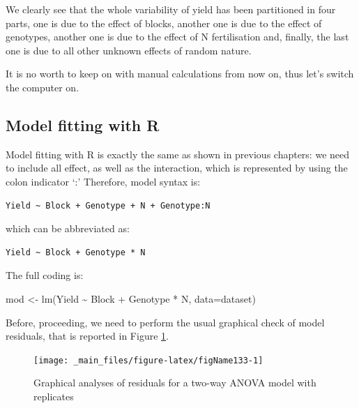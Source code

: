 \documentclass[a4paper,12pt,oneside]{book}
\newenvironment{Shaded}{\begin{snugshade}}{\end{snugshade}}
\newcommand{\SpecialCharTok}[1]{#1}
\newcommand{\OtherTok}[1]{#1}
\newcommand{\FunctionTok}[1]{#1}
\newcommand{\AttributeTok}[1]{#1}
\newcommand{\NormalTok}[1]{#1}
\begin{document}
We clearly see that the whole variability of yield has been partitioned in four parts, one is due to the effect of blocks, another one is due to the effect of genotypes, another one is due to the effect of N fertilisation and, finally, the last one is due to all other unknown effects of random nature.

It is no worth to keep on with manual calculations from now on, thus let's switch the computer on.

\hypertarget{model-fitting-with-r-1}{%
\subsection{Model fitting with R}\label{model-fitting-with-r-1}}

Model fitting with R is exactly the same as shown in previous chapters: we need to include all effect, as well as the interaction, which is represented by using the colon indicator `:' Therefore, model syntax is:

\vspace{12pt}

\begin{verbatim}
Yield ~ Block + Genotype + N + Genotype:N
\end{verbatim}

which can be abbreviated as:

\vspace{12pt}

\begin{verbatim}
Yield ~ Block + Genotype * N
\end{verbatim}

The full coding is:

\vspace{12pt}

\begin{Shaded}
\begin{Highlighting}[]
\NormalTok{mod }\OtherTok{\textless{}{-}} \FunctionTok{lm}\NormalTok{(Yield }\SpecialCharTok{\textasciitilde{}}\NormalTok{ Block }\SpecialCharTok{+}\NormalTok{ Genotype }\SpecialCharTok{*}\NormalTok{ N, }\AttributeTok{data=}\NormalTok{dataset)}
\end{Highlighting}
\end{Shaded}

Before, proceeding, we need to perform the usual graphical check of model residuals, that is reported in Figure \ref{fig:figName133}.

\vspace{12pt}
\begin{figure}

{\centering \texttt{[image: \_main\_files/figure-latex/figName133-1]} 

}

\caption{Graphical analyses of residuals for a two-way ANOVA model with replicates}\label{fig:figName133}
\end{figure}
\end{document}
